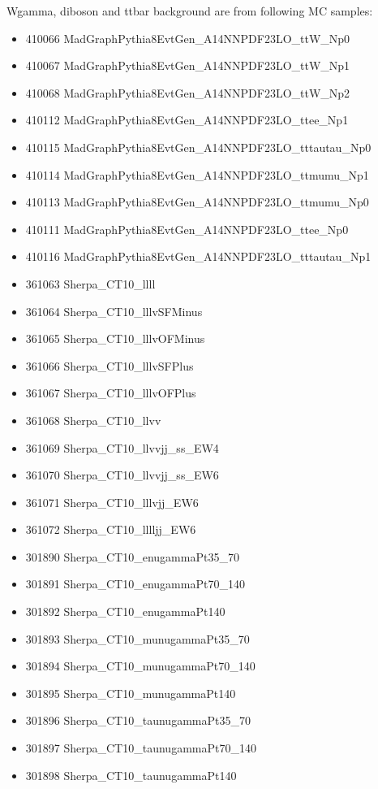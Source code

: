 Wgamma, diboson and ttbar background are from following MC samples:\\
\begin{itemize}
\item 410066	MadGraphPythia8EvtGen\_A14NNPDF23LO\_ttW\_Np0
\item 410067	MadGraphPythia8EvtGen\_A14NNPDF23LO\_ttW\_Np1
\item 410068	MadGraphPythia8EvtGen\_A14NNPDF23LO\_ttW\_Np2
\item 410112	MadGraphPythia8EvtGen\_A14NNPDF23LO\_ttee\_Np1
\item 410115	MadGraphPythia8EvtGen\_A14NNPDF23LO\_tttautau\_Np0
\item 410114	MadGraphPythia8EvtGen\_A14NNPDF23LO\_ttmumu\_Np1
\item 410113	MadGraphPythia8EvtGen\_A14NNPDF23LO\_ttmumu\_Np0
\item 410111	MadGraphPythia8EvtGen\_A14NNPDF23LO\_ttee\_Np0
\item 410116	MadGraphPythia8EvtGen\_A14NNPDF23LO\_tttautau\_Np1
\item 361063	Sherpa\_CT10\_llll
\item 361064	Sherpa\_CT10\_lllvSFMinus
\item 361065	Sherpa\_CT10\_lllvOFMinus
\item 361066	Sherpa\_CT10\_lllvSFPlus
\item 361067	Sherpa\_CT10\_lllvOFPlus
\item 361068	Sherpa\_CT10\_llvv
\item 361069	Sherpa\_CT10\_llvvjj\_ss\_EW4
\item 361070	Sherpa\_CT10\_llvvjj\_ss\_EW6
\item 361071	Sherpa\_CT10\_lllvjj\_EW6
\item 361072	Sherpa\_CT10\_lllljj\_EW6
\item 301890	Sherpa\_CT10\_enugammaPt35\_70
\item 301891	Sherpa\_CT10\_enugammaPt70\_140
\item 301892	Sherpa\_CT10\_enugammaPt140
\item 301893	Sherpa\_CT10\_munugammaPt35\_70
\item 301894	Sherpa\_CT10\_munugammaPt70\_140
\item 301895	Sherpa\_CT10\_munugammaPt140
\item 301896	Sherpa\_CT10\_taunugammaPt35\_70
\item 301897	Sherpa\_CT10\_taunugammaPt70\_140
\item 301898	Sherpa\_CT10\_taunugammaPt140
\end{itemize}

